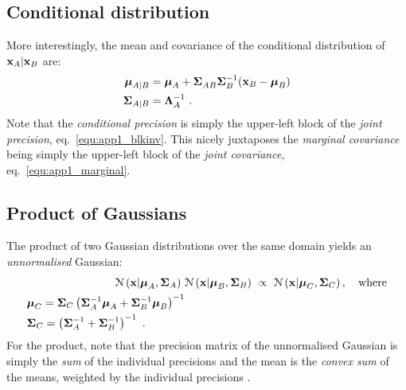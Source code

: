     \subsection{Conditional distribution}
      More interestingly,
      the mean and covariance of the conditional distribution of $\mathbf{x}_A | \mathbf{x}_B$ are:
      \begin{align}
	\boldsymbol{\mu}_{A|B} &= \boldsymbol{\mu}_{A} + \mathbf{\Sigma}^{~}_{AB} \mathbf{\Sigma}^{-1}_{B} (\mathbf{x}_B - \boldsymbol{\mu}_B) \\
	\mathbf{\Sigma}_{A|B} &= \mathbf{\Lambda}_A^{-1} ~.
      \end{align}
      Note that the \emph{conditional precision} is simply the upper-left block of the \textit{joint precision}, eq.~\eqref{equ:app1_blkinv}. This nicely juxtaposes the \emph{marginal covariance} being simply the upper-left block of the \emph{joint covariance}, eq.~\eqref{equ:app1_marginal}.


    \subsection{Product of Gaussians} \label{subsec:app1_prodGaussians}
      The product of two Gaussian distributions over the same domain yields an \emph{unnormalised} Gaussian:
      \begin{align} \label{equ:app1_Gaussian_product}
	\nonumber \mathcal{N} \left( \mathbf{x} | \boldsymbol{\mu}_A, \mathbf{\Sigma}_A \right) ~ &\mathcal{N} \left( \mathbf{x} | \boldsymbol{\mu}_B, \mathbf{\Sigma}_B \right) ~ \propto ~ \mathcal{N} \left(  \mathbf{x}| \boldsymbol{\mu}_C, \mathbf{\Sigma}_C \right), \quad \textrm{where} \\ 
	\begin{split}
	  & \boldsymbol{\mu}_C = \mathbf{\Sigma}_C \left(\mathbf{\Sigma}^{-1}_A \boldsymbol{\mu}_A + \mathbf{\Sigma}^{-1}_B \boldsymbol{\mu}_B \right)^{-1} \\
	  & \mathbf{\Sigma}_C = \left(\mathbf{\Sigma}^{-1}_A + \mathbf{\Sigma}^{-1}_B \right)^{-1} ~.
	\end{split}
      \end{align}
      For the product, note that the precision matrix of the unnormalised Gaussian is simply the \emph{sum} of the individual precisions and the mean is the \textit{convex sum} of the means, weighted by the individual precisions \citep[section A.2]{Rasmussen:book06}.

